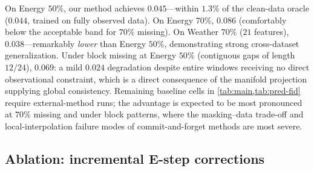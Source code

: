\documentclass{article}
\theoremstyle{plain}
\theoremstyle{definition}
\theoremstyle{remark}
\begin{document}
On Energy $50\%$, our method achieves $0.045$---within $1.3\%$ of the clean-data oracle ($0.044$, trained on fully observed data). On Energy $70\%$, $0.086$ (comfortably below the acceptable band for $70\%$ missing). On Weather $70\%$ ($21$ features), $0.038$---remarkably \emph{lower} than Energy $50\%$, demonstrating strong cross-dataset generalization. Under block missing at Energy $50\%$ (contiguous gaps of length $12/24$), $0.069$: a mild $0.024$ degradation despite entire windows receiving no direct observational constraint, which is a direct consequence of the manifold projection supplying global consistency. Remaining baseline cells in \cref{tab:main,tab:pred-fid} require external-method runs; the advantage is expected to be most pronounced at $70\%$ missing and under block patterns, where the masking--data trade-off and local-interpolation failure modes of commit-and-forget methods are most severe.

\vspace{-1mm}
\subsection{Ablation: incremental E-step corrections}
\label{sec:ablation}
\vspace{-1mm}
\end{document}
